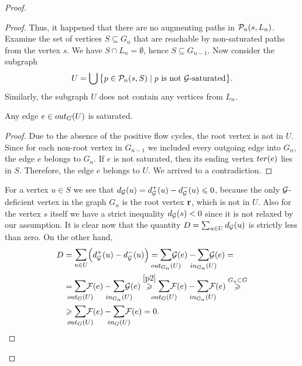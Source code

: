 \documentclass[12pt,oneside,a4paper]{amsart}
\begin{document}
\begin{proof}
\begin{proof}
          Thus, it happened that there are no augmenting paths in $\gnpaths(s, L_n)$.
          Examine the set of vertices $S \subseteq G_n$ that are reachable by non-saturated paths from the vertex $s$.
          We have $S \cap L_n = \emptyset$, hence $S \subseteq G_{n-1}$.
          Now consider the subgraph
            \[
              U = \bigcup\big\{p \in \gnpaths(s, S) \mid \text{$p$ is not $\cal{G}$-saturated}\big\}.
            \]
          Similarly, the subgraph $U$ does not contain any vertices from $L_n$.
          \begin{lemma}
            Any edge $e \in \eout_G(U)$ is saturated.
          \end{lemma}
          \begin{proof}
            Due to the absence of the positive flow cycles, the root vertex is not in $U$.
            Since for each non-root vertex in $G_{n-1}$ we included every outgoing edge into $G_n$,
              the edge $e$ belongs to $G_n$.
            If $e$ is not saturated, then its ending vertex $\ter(e)$ lies in $S$.
            Therefore, the edge $e$ belongs to $U$.
            We arrived to a contradiction.
          \end{proof}
          For a vertex $u \in S$ we see that $d_{\cal{G}}(u) = d^{+}_{\cal{G}}(u) - d^{-}_{\cal{G}}(u) \leq 0$, because
            the only $\cal{G}$-deficient vertex in the graph $G_n$ is the root vertex $\root$, which is not in $U$.
          Also for the vertex $s$ itself we have a strict inequality $d_{\cal{G}}(s) < 0$ since it is not relaxed by our assumption.
          It is clear now that the quantity $D = \sum_{u \in U} d_{\cal{G}}(u)$ is strictly less than zero.
          On the other hand,
          \[
            \begin{split}
              D &= \mathlarger\sum_{u \in U} \Big(d^{+}_{\cal{G}}(u) - d^{-}_{\cal{G}}(u)\Big)
              = \mathlarger{\smashoperator{\sum_{\eout_{G_n}(U)}}} \cal{G}(e) - \mathlarger{\smashoperator{\sum_{\ein_{G_n}(U)}}} \cal{G}(e) = \\
              &= \mathlarger{\smashoperator{\sum_{\eout_{G}(U)}}} \flowpos(e) - \mathlarger{\smashoperator{\sum_{\ein_{G_n}(U)}}} \cal{G}(e)
                \overset{\ref{p2}}{\geq} \mathlarger{\smashoperator{\sum_{\eout_G(U)}}} \flowpos(e) - \mathlarger{\smashoperator{\sum_{\ein_{G_n}(U)}}} \flowpos(e) 
                \overset{G_n \subset G} \geq \\
              &\geq \mathlarger{\smashoperator{\sum_{\eout_G(U)}}} \flowpos(e) - \mathlarger{\smashoperator{\sum_{\ein_{G}(U)}}} \flowpos(e) = 0.

\end{split}\]
\end{proof}
\end{proof}
\end{document}
